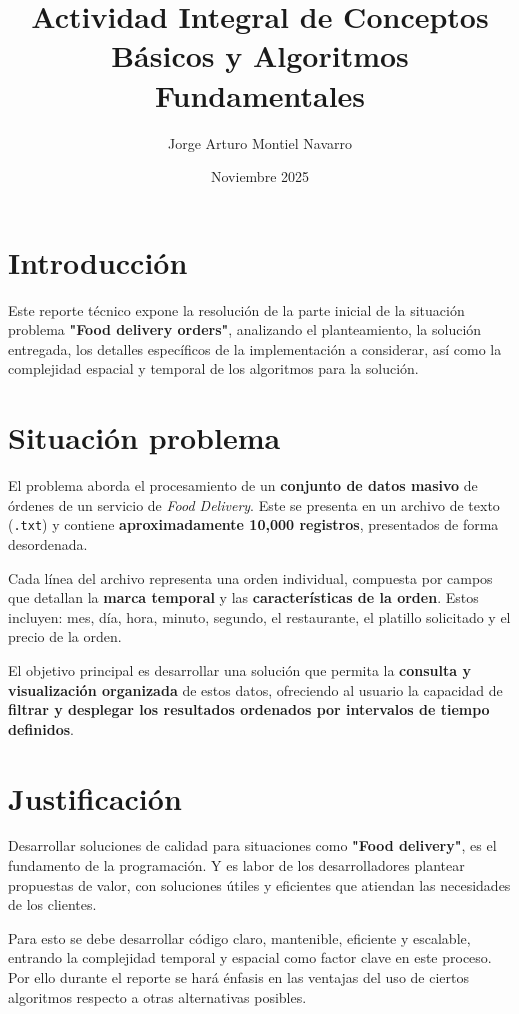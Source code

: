 \documentclass{article}
\title {Actividad Integral de Conceptos Básicos y Algoritmos Fundamentales }
\author{ Jorge Arturo Montiel Navarro }
\date{Noviembre 2025}
\begin{document}
\maketitle

\tableofcontents

\section{Introducción}
Este reporte técnico expone la resolución de la parte inicial de la situación problema \textbf{"Food delivery orders"},  analizando el planteamiento, la solución entregada, los detalles específicos de la implementación a considerar, así como la complejidad espacial y temporal de los algoritmos para la solución.


\section{Situación problema}

El problema aborda el procesamiento de un \textbf{conjunto de datos masivo} de órdenes de un servicio de \textit{Food Delivery}. Este  se presenta en un archivo de texto (\texttt{.txt}) y contiene \textbf{aproximadamente 10,000 registros}, presentados de forma desordenada.

Cada línea del archivo representa una orden individual, compuesta por campos que detallan la \textbf{marca temporal} y las \textbf{características de la orden}. Estos incluyen: mes, día, hora, minuto, segundo, el restaurante, el platillo solicitado y el precio de la orden.

El objetivo principal es desarrollar una solución que permita la \textbf{consulta y visualización organizada} de estos datos, ofreciendo al usuario la capacidad de \textbf{filtrar y desplegar los resultados ordenados por intervalos de tiempo definidos}.



\section{Justificación}
Desarrollar soluciones de calidad para situaciones como \textbf{"Food delivery"}, es el fundamento de la programación. Y es labor de los desarrolladores plantear propuestas de valor, con soluciones útiles y eficientes que atiendan las necesidades de los clientes.

Para esto se debe desarrollar código claro, mantenible, eficiente y escalable, entrando la complejidad temporal y espacial como factor clave en este proceso.
\smallskip
Por ello durante el reporte se hará énfasis en las ventajas del uso de ciertos algoritmos respecto a otras alternativas posibles.
\end{document}
